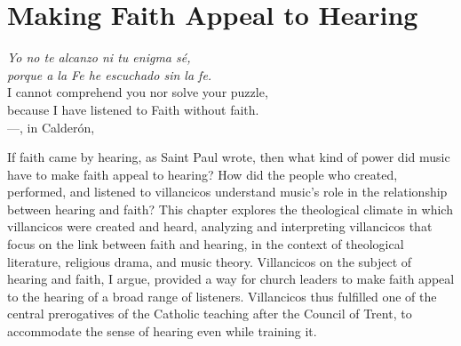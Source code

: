 
%
%
%



\chapter{Making Faith Appeal to Hearing}
\label{ch:faith-hearing}

\begin{epigraph}
        \emph{Yo no te alcanzo ni tu enigma sé,} \\
        \emph{porque a la Fe he escuchado sin la fe.} \\[1ex]

        I cannot comprehend you nor solve your puzzle, \\
        because I have listened to Faith without faith. \\[1ex]

        ---, in Calderón, 
        \Autocite[]{Calderon:Retiro}
\end{epigraph}

If faith came by hearing, as Saint Paul wrote, then what kind of power did music
have to make faith appeal to hearing?
How did the people who created, performed, and listened to villancicos
understand music's role in the relationship between hearing and faith?
This chapter explores the theological climate in which villancicos were created
and heard, analyzing and interpreting villancicos that focus on the link between
faith and hearing, in the context of theological literature, religious drama,
and music theory.
Villancicos on the subject of hearing and faith, I argue, provided a way for
church leaders to make faith appeal to the hearing of a broad range of
listeners.
Villancicos thus fulfilled one of the central prerogatives of the Catholic
teaching after the Council of Trent, to accommodate the sense of
hearing even while training it.

